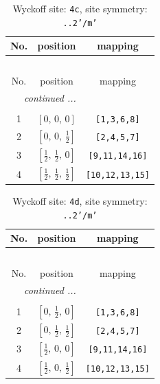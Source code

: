 \documentclass[fleqn,8pt]{jsarticle}
\begin{document}
\renewcommand{\arraystretch}{1.2}
\begin{longtable}{ccc}
\caption{Wyckoff site: {\tt 4c}, site symmetry: {\tt ..2'/m'}}
 \\
 \hline \hline
No. & position & mapping \\ \hline \endfirsthead

\multicolumn{2}{l}{\tablename\ \thetable{}} \\
 \hline \hline
No. & position & mapping \\ \hline \endhead

 \hline \hline
\multicolumn{2}{r}{\footnotesize\it continued ...} \\ \endfoot

 \hline \hline
\multicolumn{2}{r}{} \\ \endlastfoot

1 & $\left[ 0,\, 0,\, 0 \right]$ & {\tt [1,3,6,8]} \\ \hline
2 & $\left[ 0,\, 0,\, \frac{1}{2} \right]$ & {\tt [2,4,5,7]} \\ \hline
3 & $\left[ \frac{1}{2},\, \frac{1}{2},\, 0 \right]$ & {\tt [9,11,14,16]} \\ \hline
4 & $\left[ \frac{1}{2},\, \frac{1}{2},\, \frac{1}{2} \right]$ & {\tt [10,12,13,15]} \\
\end{longtable}
\renewcommand{\arraystretch}{1.2}
\begin{longtable}{ccc}
\caption{Wyckoff site: {\tt 4d}, site symmetry: {\tt ..2'/m'}}
 \\
 \hline \hline
No. & position & mapping \\ \hline \endfirsthead

\multicolumn{2}{l}{\tablename\ \thetable{}} \\
 \hline \hline
No. & position & mapping \\ \hline \endhead

 \hline \hline
\multicolumn{2}{r}{\footnotesize\it continued ...} \\ \endfoot

 \hline \hline
\multicolumn{2}{r}{} \\ \endlastfoot

1 & $\left[ 0,\, \frac{1}{2},\, 0 \right]$ & {\tt [1,3,6,8]} \\ \hline
2 & $\left[ 0,\, \frac{1}{2},\, \frac{1}{2} \right]$ & {\tt [2,4,5,7]} \\ \hline
3 & $\left[ \frac{1}{2},\, 0,\, 0 \right]$ & {\tt [9,11,14,16]} \\ \hline
4 & $\left[ \frac{1}{2},\, 0,\, \frac{1}{2} \right]$ & {\tt [10,12,13,15]} \\
\end{longtable}
\end{document}
